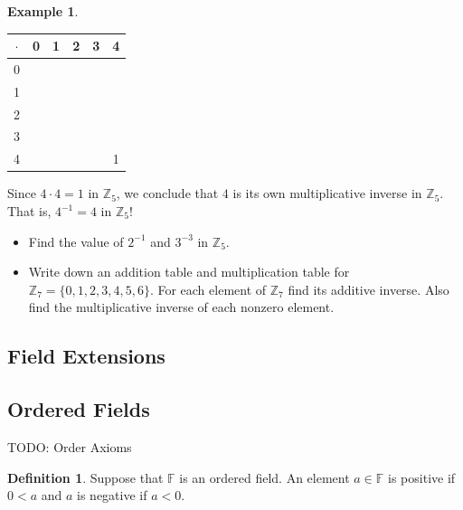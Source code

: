 \documentclass[11pt]{article}
\newenvironment{task}
	{\begin{mdframed}[linecolor=lightgray, linewidth=3pt]\raggedright}
	{\end{mdframed}}
\theoremstyle{definition}
\newtheorem{definition}[theorem]{Definition}
\newtheorem{example}[theorem]{Example}
\begin{document}
\begin{example}
  \begin{center}
    \begin{tabular}{|c|c|c|c|c|c|}\\ \hline
      $\cdot$ & 0 & 1 & 2 & 3 & 4 \\ \hline
      0   &   &   &   &   &   \\ \hline
      1   &   &   &   &   &   \\ \hline
      2   &   &   &   &   &   \\ \hline
      3   &   &   &   &   &   \\ \hline
      4   &   &   &   &   & 1 \\ \hline
    \end{tabular}
  \end{center}

  Since $4\cdot 4 = 1$ in $\mathbb{Z}_5$, we conclude that $4$ is its own multiplicative inverse in $\mathbb{Z}_5$. That is, $4^{-1}=4$ in $\mathbb{Z}_5$!

  \begin{task}
    \begin{itemize}
      \item Find the value of $2^{-1}$ and $3^{-3}$ in $\mathbb{Z}_5$.
    \end{itemize}
  \end{task}

\end{example}

\begin{task}
  \begin{itemize}
    \item Write down an addition table and multiplication table for $\mathbb{Z}_7 = \{0, 1, 2, 3, 4, 5, 6 \}$. For each element of $\mathbb{Z}_7$ find
      its additive inverse. Also find the multiplicative inverse of each nonzero element.
  \end{itemize}
\end{task}

\subsection{Field Extensions}

\subsection{Ordered Fields}

TODO: Order Axioms

\begin{definition}
  Suppose that $\mathbb{F}$ is an ordered field. An element $a\in\mathbb{F}$ is positive if $0 < a$ and $a$ is negative if $a < 0$.
\end{definition}
\end{document}
